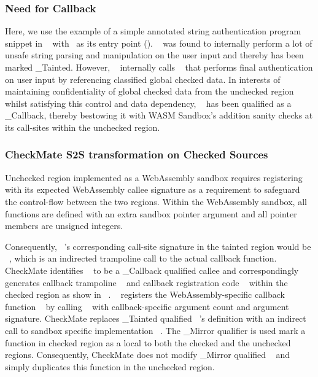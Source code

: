 \subsubsection{\textbf{Need for Callback}}
Here, we use the example of a simple \systemname annotated string authentication program snippet in ~ with~ as its entry point (\entrypoint). ~ was found to internally perform a lot of unsafe string parsing and manipulation on the user input and thereby has been marked \_Tainted. However, ~ internally calls ~ that performs final authentication on user input by referencing classified global checked data. In interests of maintaining confidentiality of global checked data from the unchecked region whilst satisfying this control and data dependency, ~ has been qualified as a \_Callback, thereby bestowing it with WASM Sandbox's addition sanity checks at its call-sites within the unchecked region.

\subsubsection{\textbf{CheckMate S2S transformation on Checked Sources}}
Unchecked region implemented as a WebAssembly sandbox requires registering ~ with its expected WebAssembly callee signature as a requirement to safeguard the control-flow between the two regions.
Within the WebAssembly sandbox, all functions are defined with an extra sandbox pointer argument and all pointer members are unsigned integers. 

Consequently, ~'s corresponding call-site signature in the tainted region would be 
\newline
~, which is an indirected trampoline call to the actual callback function. CheckMate identifies ~ to be a \_Callback qualified callee and correspondingly generates callback trampoline ~ and callback registration code 
\newline
~ within the checked region as show in ~. 
~ registers the WebAssembly-specific callback function ~ by calling ~ with callback-specific argument count and argument signature. 
CheckMate replaces \_Tainted qualified ~'s definition with an indirect call to sandbox specific implementation ~. The \_Mirror qualifier is used mark a function in checked region as a local to both the checked and the unchecked regions. Consequently, CheckMate does not modify \_Mirror qualified ~ and simply duplicates this function in the unchecked region.

